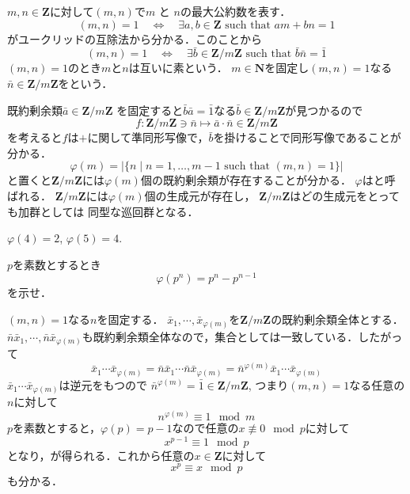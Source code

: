 

$m, n\in \mathbf Z$に対して$(m,n)$で$m$ と $n$の最大公約数を表す．
\[
   (m,n)=1
   \quad \Leftrightarrow\quad
   \exists a, b\in \mathbf Z \text{ such that } am + bn =1
\]
がユークリッドの互除法から分かる．このことから
\[
   (m,n)=1\quad 
   \Leftrightarrow\quad
   \exists  \bar b\in \mathbf Z/m\mathbf Z \text{ such that } 
         \bar b\bar n= \bar 1
\]
$(m,n)=1$のとき$m$と$n$は互いに素という．
$m\in \mathbf N$を固定し$(m,n)=1$なる
$\bar n\in\mathbf Z/m\mathbf Z$をという．

既約剰余類$\bar a\in \mathbf Z/m\mathbf Z$ を固定すると$\bar b\bar a = \bar 1$なる$\bar b\in \mathbf Z/m\mathbf Z$が見つかるので
\[
   f:\mathbf Z/m\mathbf Z\ni \bar n 
    \mapsto \bar{a}\cdot\bar{n}\in  \mathbf Z/m\mathbf Z
\]
を考えると$f$は$+$に関して準同形写像で，$\bar b$を掛けることで同形写像であることが分かる．
\[
   \varphi(m)= |\{n\mid n=1,\dots, m-1 \text{ such that } (m,n)=1\}|
\]
と置くと$\mathbf Z/m\mathbf Z$には$\varphi(m)$個の既約剰余類が存在することが分かる．
$\varphi$はと呼ばれる．
$\mathbf Z/m\mathbf Z$には$\varphi(m)$個の生成元が存在し，
$\mathbf Z/m\mathbf Z$はどの生成元をとっても加群としては
同型な巡回群となる．

\begin{ex}
   $\varphi(4)=2$, $\varphi(5)=4$.
\end{ex}

\begin{Q}
   $p$を素数とするとき
   \[
      \varphi(p^n)=p^n-p^{n-1}
   \]
   を示せ．
\end{Q}



$(m,n)=1$なる$n$を固定する．
$\bar x_1, \cdots, \bar x_{\varphi(m)}$を$\mathbf Z/m\mathbf Z$の既約剰余類全体とする．$\bar n \bar x_1, \cdots , \bar n\bar x_{\varphi(m)}$も既約剰余類全体なので，集合としては一致している．したがって
\[
   \bar x_1\cdots \bar x_{\varphi(m)}=\bar n\bar  x_1 \cdots \bar n \bar x_{\varphi(m)}
   =\bar n^{\varphi(m)}\bar x_1\cdots \bar x_{\varphi(m)}
\]
$\bar x_1\cdots \bar x_{\varphi(m)}$は逆元をもつので
$
   \bar n^{\varphi(m)}=\bar 1\in\mathbf Z/m\mathbf Z
$,  つまり$(m,n)=1$なる任意の$n$に対して
\begin{equation}\label{varphi}
   n^{\varphi(m)}\equiv 1 \mod m
\end{equation}
$p$を素数とすると，$\varphi(p)=p-1$なので任意の$x\not\equiv 0 \mod p$に対して
\[
   x^{p-1}\equiv 1 \mod p
\]
となり，が得られる．これから任意の$x\in \mathbf Z$に対して
\begin{equation}\label{funPoly}
   x^{p}\equiv x \mod p
\end{equation}
も分かる．


